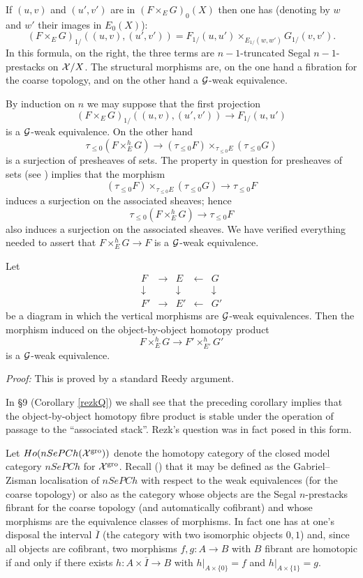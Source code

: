 If $(u,v)$ and $(u',v')$ are in $(F\times _EG)_0(X)$ then one has
(denoting by $w$ and $w'$ their images in $E_0(X)$):
$$
(F\times _EG)_{1/}((u,v), (u',v')) =
F_{1/}(u,u')\times _{E_{1/} (w,w')}G_{1/}(v,v').
$$
In this formula, on the right, the three terms are
$n-1$-truncated Segal $n-1$-prestacks on ${\cal X} /X$.
The structural morphisms are, on the one hand a fibration for the coarse
topology, and on the other hand a ${\cal G}$-weak equivalence.

 By induction
on $n$ we may suppose that the first projection
$$
(F\times _EG)_{1/}((u,v), (u',v'))
\rightarrow F_{1/}(u,u')
$$
is a ${\cal G}$-weak equivalence. On the other hand
$$
\tau _{\leq 0} (F\times ^h_EG) \rightarrow
(\tau _{\leq 0} F)\times _{\tau _{\leq 0} E} (\tau _{\leq 0} G)
$$
is a surjection of presheaves of sets.
The property in question for
presheaves of sets (see \cite{Rezk}) implies that the morphism
$$
(\tau _{\leq 0} F)\times _{\tau _{\leq 0} E} (\tau _{\leq 0} G)\rightarrow
\tau _{\leq 0} F
$$
induces a surjection on the associated sheaves; hence
$$
\tau _{\leq 0} (F\times ^h_EG)\rightarrow \tau _{\leq 0} F
$$
also induces
a surjection on the associated sheaves. We have verified everything
needed
to assert that $F\times ^h_EG\rightarrow F$ is a ${\cal G}$-weak
equivalence. \eop

\begin{corollary}
\label{cordereedy}
Let
$$
\begin{array}{ccccc}
F&\rightarrow & E & \leftarrow & G\\
\downarrow &&\downarrow && \downarrow \\
F'&\rightarrow & E' & \leftarrow & G'
\end{array}
$$
be a diagram in which the vertical morphisms are ${\cal G}$-weak
equivalences.
Then the morphism induced on the object-by-object homotopy product
$$
F\times ^h_EG\rightarrow F'\times ^h_{E'}G'
$$
is a ${\cal G}$-weak equivalence.
\end{corollary}
{\em  Proof:}
This is proved by a standard Reedy argument.
\eop

In \S 9 (Corollary \ref{rezkQ}) we shall see that the preceding corollary
implies that the
object-by-object homotopy fibre product is stable under the operation of
passage to the ``associated stack''. Rezk's question was in fact posed in this
form.




Let $Ho(nSePCh({\cal X} ^{\rm gro}))$ denote the homotopy category
of the closed model category $nSePCh$ for ${\cal X}^{\rm gro}$.
Recall (\cite{Quillen}) that it may be defined as the Gabriel--Zisman
localisation \cite{GabrielZisman} of $nSePCh$ with respect to the
weak equivalences (for the coarse topology) or also as the
category whose objects are the Segal $n$-prestacks fibrant for the
coarse topology (and automatically cofibrant) and whose morphisms
are the equivalence classes of morphisms. In fact one has at one's disposal
the interval
$\overline{I}$ (the category with two isomorphic objects $0,1$) and, since all
objects are cofibrant, two morphisms $f,g:A\rightarrow B$ with $B$
fibrant are homotopic if and only if there exists $h: A\times
\overline{I}\rightarrow B$ with $h|_{A\times \{ 0\} }=f$ and
$h|_{A\times \{ 1\} }=g$.

